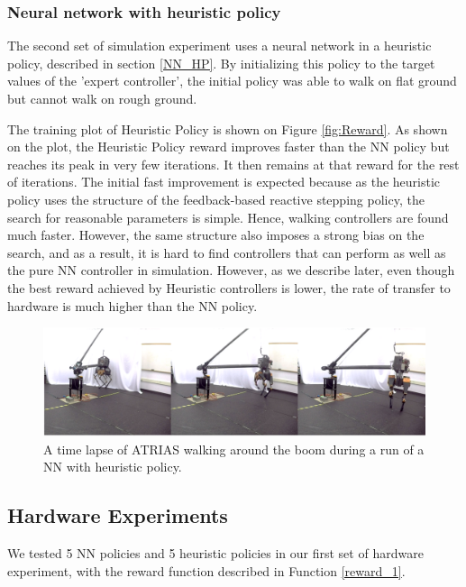 \subsubsection{Neural network with heuristic policy}

The second set of simulation experiment uses a neural network in a heuristic policy, described in section \ref{NN_HP}. %
By initializing this policy to the target values of the 'expert controller', the initial policy was able to walk on flat ground but cannot walk on rough ground. %

The training plot of Heuristic Policy is shown on Figure \ref{fig:Reward}. As shown on the plot, the Heuristic Policy reward improves faster than the NN policy but reaches its peak in very few iterations. It then remains at that reward for the rest of iterations. The initial fast improvement is expected because as the heuristic policy uses the structure of the feedback-based reactive stepping policy, the search for reasonable parameters is simple. Hence, walking controllers are found much faster. However, the same structure also imposes a strong bias on the search, and as a result, it is hard to find controllers that can perform as well as the pure NN controller in simulation. However, as we describe later, even though the best reward achieved by Heuristic controllers is lower, the rate of transfer to hardware is much higher than the NN policy.

\begin{figure}[t]
	\centering
	\includegraphics[width=.85\textwidth]{img/Hardware.PNG}
    \caption{A time lapse of ATRIAS walking around the boom during a run of a NN with heuristic policy.}
    \label{fig:Hardware_walking}
\end{figure}

\subsection{Hardware Experiments}
\label{sec:nn_expts}
We tested 5 NN policies and 5 heuristic policies in our first set of hardware experiment, with the reward function described in Function \ref{reward_1}. 

